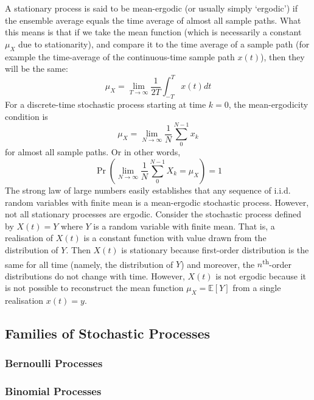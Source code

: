\documentclass[11pt]{report} %
\begin{document}
A stationary process is said to be mean-ergodic (or usually simply `ergodic') if the ensemble average equals the time average of almost all sample paths. What this means is that if we take the mean function (which is necessarily a constant $\mu_{X}$ due to stationarity), and compare it to the time average of a sample path (for example the time-average of the continuous-time sample path $x\left(t\right)$), then they will be the same:
\begin{equation}
\mu_{X} = \lim_{T\to\infty}\dfrac{1}{2T}\int_{-T}^{T}x\left(t\right)dt
\end{equation}
For a discrete-time stochastic process starting at time $k = 0$, the mean-ergodicity condition is
\begin{equation}
\mu_{X} = \lim_{N\to\infty}\dfrac{1}{N}\sum_{0}^{N - 1}x_{k}
\end{equation}
for almost all sample paths. Or in other words,
\begin{equation}
\operatorname{Pr}\left(\lim_{N\to\infty}\dfrac{1}{N}\sum_{0}^{N - 1}X_{k} = \mu_{X}\right) = 1
\end{equation}
The strong law of large numbers easily establishes that any sequence of i.i.d. random variables with finite mean is a mean-ergodic stochastic process. However, not all stationary processes are ergodic. Consider the stochastic process defined by $X\left(t\right) = Y$ where $Y$ is a random variable with finite mean. That is, a realisation of $X\left(t\right)$ is a constant function with value drawn from the distribution of $Y$. Then $X\left(t\right)$ is stationary because first-order distribution is the same for all time (namely, the distribution of $Y$) and moreover, the $n$\textsuperscript{th}-order distributions do not change with time. However, $X\left(t\right)$ is not ergodic because it is not possible to reconstruct the mean function $\mu_{X} = \mathbb{E}\left[Y\right]$ from a single realisation $x\left(t\right) = y$.

\subsection{Families of Stochastic Processes}

\subsubsection{Bernoulli Processes}

\subsubsection{Binomial Processes}
\end{document}
